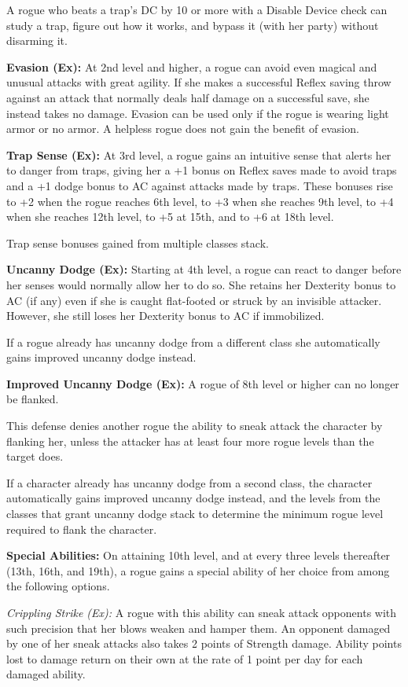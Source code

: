 A rogue who beats a trap's DC by 10 or more with a Disable Device check can study a trap, figure out how it works, and bypass it (with her party) without disarming it.

\textbf{Evasion (Ex):} At 2nd level and higher, a rogue can avoid even magical and unusual attacks with great agility. If she makes a successful Reflex saving throw against an attack that normally deals half damage on a successful save, she instead takes no damage. Evasion can be used only if the rogue is wearing light armor or no armor. A helpless rogue does not gain the benefit of evasion.

\textbf{Trap Sense (Ex):} At 3rd level, a rogue gains an intuitive sense that alerts her to danger from traps, giving her a +1 bonus on Reflex saves made to avoid traps and a +1 dodge bonus to AC against attacks made by traps. These bonuses rise to +2 when the rogue reaches 6th level, to +3 when she reaches 9th level, to +4 when she reaches 12th level, to +5 at 15th, and to +6 at 18th level.

Trap sense bonuses gained from multiple classes stack.

\textbf{Uncanny Dodge (Ex):} Starting at 4th level, a rogue can react to danger before her senses would normally allow her to do so. She retains her Dexterity bonus to AC (if any) even if she is caught flat-footed or struck by an invisible attacker. However, she still loses her Dexterity bonus to AC if immobilized.

If a rogue already has uncanny dodge from a different class she automatically gains improved uncanny dodge instead.

\textbf{Improved Uncanny Dodge (Ex):} A rogue of 8th level or higher can no longer be flanked.

This defense denies another rogue the ability to sneak attack the character by flanking her, unless the attacker has at least four more rogue levels than the target does.

If a character already has uncanny dodge from a second class, the character automatically gains improved uncanny dodge instead, and the levels from the classes that grant uncanny dodge stack to determine the minimum rogue level required to flank the character.

\textbf{Special Abilities:} On attaining 10th level, and at every three levels thereafter (13th, 16th, and 19th), a rogue gains a special ability of her choice from among the following options.

\textit{Crippling Strike (Ex):} A rogue with this ability can sneak attack opponents with such precision that her blows weaken and hamper them. An opponent damaged by one of her sneak attacks also takes 2 points of Strength damage. Ability points lost to damage return on their own at the rate of 1 point per day for each damaged ability.

